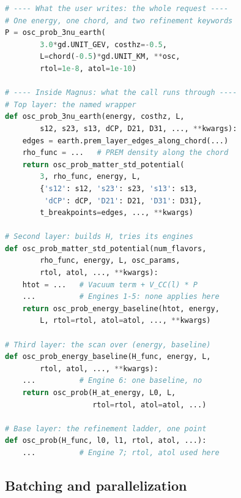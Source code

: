 \documentclass[final,5p,times,twocolumn,sort,compress]{elsarticle}
\makeatletter
\newcommand{\fig}{Fig.}
\DeclareRobustCommand{\_}{%
  \ifmmode\nfss@text{\textunderscore}\else\textunderscore\allowbreak\fi}
\newcommand{\figu}[1]{\fig~\ref{fig:#1}}
\newcommand{\magnus}{{\tt Mag}\ensuremath{\nu}{\tt s}}
\makeatother
\begin{document}
\begin{lstlisting}[language=Python, caption={\textbf{A probability request through the layers of \magnus.} A request through the four layers of \figu{layers}: one energy along an Earth chord. The first block is what the user writes. The four blocks below it are the functions inside \magnus\ that the call passes through, defined in the module {\tt magnus.oscprob} ({\tt src/magnus/oscprob.py}) and abbreviated to the arguments that carry the request on. See Sec.~\ref{sec:one_request} for details.}, label={lst:layers}, float=tbp]
# ---- What the user writes: the whole request ----
# One energy, one chord, and two refinement keywords
P = osc_prob_3nu_earth(
        3.0*gd.UNIT_GEV, costhz=-0.5,
        L=chord(-0.5)*gd.UNIT_KM, **osc,
        rtol=1e-8, atol=1e-10)

# ---- Inside Magnus: what the call runs through ----
# Top layer: the named wrapper
def osc_prob_3nu_earth(energy, costhz, L,
        s12, s23, s13, dCP, D21, D31, ..., **kwargs):
    edges = earth.prem_layer_edges_along_chord(...)
    rho_func = ...   # PREM density along the chord
    return osc_prob_matter_std_potential(
        3, rho_func, energy, L,
        {'s12': s12, 's23': s23, 's13': s13,
         'dCP': dCP, 'D21': D21, 'D31': D31},
        t_breakpoints=edges, ..., **kwargs)

# Second layer: builds H, tries its engines
def osc_prob_matter_std_potential(num_flavors,
        rho_func, energy, L, osc_params,
        rtol, atol, ..., **kwargs):
    htot = ...   # Vacuum term + V_CC(l) * P
    ...          # Engines 1-5: none applies here
    return osc_prob_energy_baseline(htot, energy,
        L, rtol=rtol, atol=atol, ..., **kwargs)

# Third layer: the scan over (energy, baseline)
def osc_prob_energy_baseline(H_func, energy, L,
        rtol, atol, ..., **kwargs):
    ...          # Engine 6: one baseline, no
    return osc_prob(H_at_energy, L0, L,
                    rtol=rtol, atol=atol, ...)

# Base layer: the refinement ladder, one point
def osc_prob(H_func, l0, l1, rtol, atol, ...):
    ...          # Engine 7; rtol, atol used here
\end{lstlisting}


\subsection{Batching and parallelization}
\label{sec:batching}
\end{document}
